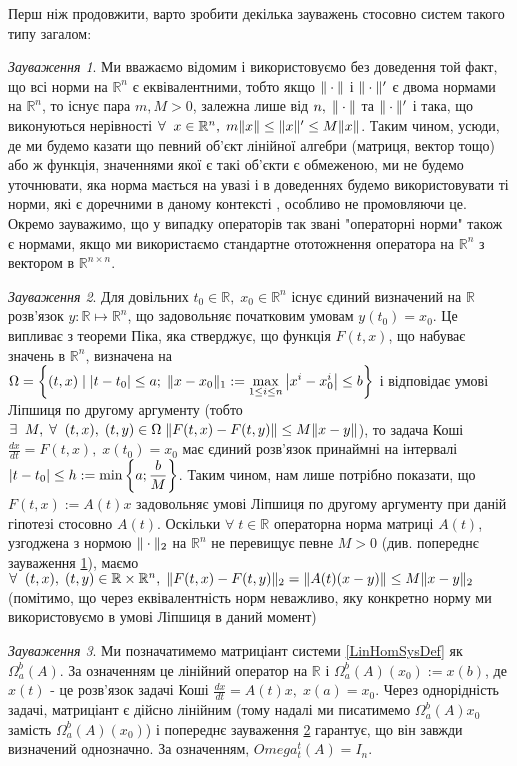\documentclass[14pt]{extarticle} %
\let\oldforall\forall
\renewcommand{\forall}{\oldforall\;}
\let\oldexists\exists
\renewcommand{\exists}{\oldexists\;}
\theoremstyle{remark}
\newtheorem{remark}{Зауваження}
\begin{document}
Перш ніж продовжити, варто зробити декілька зауважень стосовно систем такого типу загалом:
\begin{remark}\label{AllNormsAreEqRemark}
	Ми вважаємо відомим і використовуємо без доведення той факт, що всі норми на $\mathbb{R}^n$ є еквівалентними,
	тобто якщо $\|\cdot\|$ і $\|\cdot\|'$ є двома нормами на $\mathbb{R}^n$, то існує пара $m,M>0$, залежна
	лише від $n,\;\|\cdot\|$ та $\|\cdot\|'$ і така, що виконуються нерівності $\forall x\in\mathbb{R}^n,\;m\mynorm{x}\leq
	\mynorm{x}'\leq M\mynorm{x}$. Таким чином, усюди, де ми будемо казати що певний об’єкт лінійної алгебри (матриця, вектор тощо) або ж
	функція, значеннями якої є такі об’єкти є обмеженою, ми не будемо уточнювати, яка норма мається на увазі і в доведеннях будемо 
	використовувати ті норми, які є доречними в даному контексті
	, особливо не промовляючи це. Окремо зауважимо, що у випадку операторів так звані "операторні норми" також
	є нормами, якщо ми використаємо стандартне ототожнення оператора на $\mathbb{R}^n$ з вектором в $\mathbb{R}^{n\times n}$.
\end{remark}
\begin{remark}\label{SolsExistAndUniqRemark}
	Для довільних $t_0\in\mathbb{R},\;x_0\in\mathbb{R}^n$ існує єдиний визначений на 
$\mathbb{R}$ розв'язок $y:\mathbb{R}\mapsto\mathbb{R}^n$, що задовольняє початковим умовам $y(t_0)=x_0$.
Це випливає з теореми Піка, яка стверджує, що функція $F(t,x)$, що набуває значень в $\mathbb{R}^n$, визначена на 
$\Omega=\left\{(t,x) \mid \myabs{t-t_0}\leq a;\;\mynorm{x-x_0}_1:=\max_{1\leq i\leq n}\myabs{x^i-x^i_0}\leq b\right\}$ і відповідає умові Ліпшиця по другому аргументу (тобто 
$\exists M,\;\forall (t,x),\;(t,y)\in\Omega\;\mynorm{F(t,x)-F(t,y)}\leq M\mynorm{x-y}$), то задача Коші $\frac{dx}{dt}=F(t,x),\;x(t_0)=x_0$
має єдиний розв’язок принаймні на інтервалі $\myabs{t-t_0}\leq h:=\min\left\{a;\frac{b}{M}\right\}$. Таким чином, нам лише потрібно показати,
що $F(t,x):=A(t)x$ задовольняє умові Ліпшиця по другому аргументу при даній гіпотезі стосовно $A(t)$. Оскільки $\forall t\in\mathbb{R}$
операторна норма матриці $A(t)$, узгоджена з нормою $\|\cdot\|_2$ на $\mathbb{R}^n$ не перевищує певне $M>0$
(див. попереднє зауваження \ref{AllNormsAreEqRemark}), маємо 
$\forall (t,x),\;(t,y)\in\mathbb{R}\times\mathbb{R}^n,\;\mynorm{F(t,x)-F(t,y)}_2=\mynorm{A(t)(x-y)}\leq M\mynorm{x-y}_2$ (помітимо,
що через еквівалентність норм неважливо, яку конкретно норму ми використовуємо в умові Ліпшиця в даний момент)
\end{remark}
\begin{remark}
	Ми позначатимемо матриціант системи \ref{LinHomSysDef} як $\Omega_a^b(A)$. За означенням це лінійний
	оператор на $\mathbb{R}$ і $\Omega_a^b(A)(x_0):=x(b)$, де $x(t)$ - це розв’язок задачі Коші $\frac{dx}{dt}=
	A(t)x,\;x(a)=x_0$. Через однорідність задачі, матриціант є дійсно лінійним (тому надалі ми
	писатимемо $\Omega_a^b(A)x_0$ замість $\Omega_a^b(A)(x_0)$) і попереднє зауваження \ref{SolsExistAndUniqRemark}
	гарантує, що він завжди визначений однозначно. За означенням, $Omega^t_t(A)=I_n$.
\end{remark}
\end{document}
